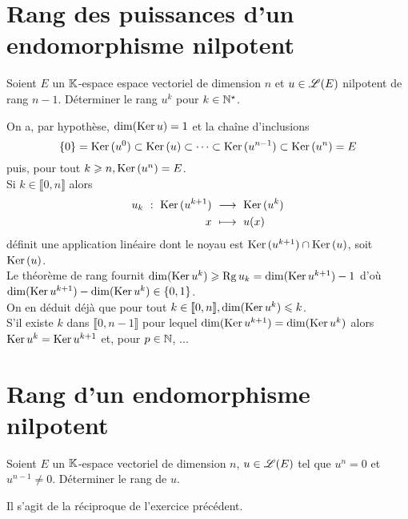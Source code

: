 \section{Rang des puissances d'un endomorphisme nilpotent} 
\begin{exercice}
    Soient $E$ un $\mathbb{K}$-espace espace vectoriel de dimension $n$ et $u \in \mathscr{L}(E)$ nilpotent de rang $n-1$. Déterminer le rang $u^k$ pour $k \in \mathbb{N}^\star$. 
\end{exercice}

\begin{solution}
    On a, par hypothèse, $\dim(\mathrm{Ker}\, u) = 1$ et la chaîne d'inclusions
    $$\{0\} = \mathrm{Ker}\,(u^0) \subset \mathrm{Ker}\,(u) \subset \cdots \subset \mathrm{Ker}\,(u^{n-1}) \subset \mathrm{Ker}\,(u^n) = E$$
    puis, pour tout $k \geqslant n, \mathrm{Ker}\,(u^n) = E$. \\
    Si $k \in \llbracket 0, n \rrbracket$ alors 
    \begin{alignat*}{2}
        u_k\ :\ \mathrm{Ker}\,(u^{k+1})\ &\longrightarrow\ \mathrm{Ker}\,(u^k)\\
        x\ &\longmapsto\ u(x)
    \end{alignat*}
    définit une application linéaire dont le noyau est $\mathrm{Ker}\,(u^{k+1}) \cap \mathrm{Ker}\,(u)$, soit $\mathrm{Ker}\,(u)$. \\
    Le théorème de rang fournit $\dim(\mathrm{Ker}\, u^k) \geqslant \mathrm{Rg}\, u_k = \dim( \mathrm{Ker}\, u^{k+1}) - 1$ d'où $\dim(\mathrm{Ker}\, u^{k+1}) - \dim(\mathrm{Ker}\, u^k) \in \{ 0, 1 \}$. \\
    On en déduit déjà que pour tout $k \in \llbracket 0, n \rrbracket, \dim(\mathrm{Ker}\, u^k) \leqslant k$. \\
    S'il existe $k$ dans $\llbracket 0, n-1 \rrbracket$ pour lequel $\dim( \mathrm{Ker}\, u^{k+1}) = \dim(\mathrm{Ker}\, u^k)$ alors $\mathrm{Ker}\, u^k = \mathrm{Ker}\, u^{k+1}$ et, pour $p \in \mathbb{N}$, 
    ...
\end{solution}

\section{Rang d'un endomorphisme nilpotent} 
\begin{exercice}
    Soient $E$ un $\mathbb{K}$-espace vectoriel de dimension $n$, $u \in \mathscr{L}(E)$ tel que $u^n = 0$ et $u^{n-1} \not= 0$. Déterminer le rang de $u$.
\end{exercice}

Il s'agit de la réciproque de l'exercice précédent.

